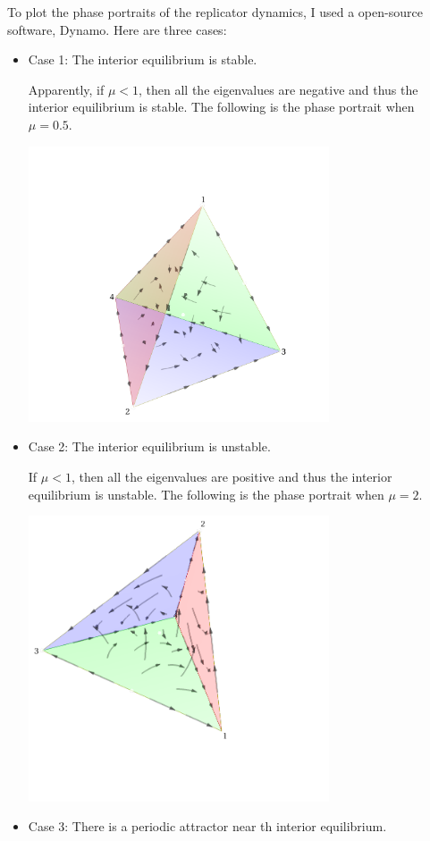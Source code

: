\documentclass[a4 paper, 12pt]{article}
\begin{document}
 To plot the phase portraits of the replicator dynamics, I used a open-source software, Dynamo. Here are three cases:
\begin{itemize}
        \item Case 1: The interior equilibrium is stable.
        
        Apparently, if $\mu<1$, then all the eigenvalues are negative and thus the interior equilibrium is stable. The following is the phase portrait when $\mu = 0.5$.
        \begin{center}
                \includegraphics[width = 0.7\textwidth]{stable.pdf}
        \end{center}

        \item Case 2: The interior equilibrium is unstable.
        
        If $\mu<1$, then all the eigenvalues are positive and thus the interior equilibrium is unstable. The following is the phase portrait when $\mu = 2$.
        \begin{center}
                \includegraphics[width = 0.7\textwidth]{unstable.pdf}
        \end{center}

        \item Case 3: There is a periodic attractor near th interior equilibrium.

\end{itemize}
\end{document}
